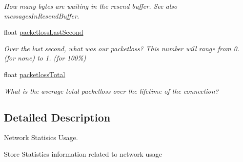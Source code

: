 \begin{DoxyCompactItemize}
\begin{DoxyCompactList}\small\item\em How many bytes are waiting in the resend buffer. See also messages\-In\-Resend\-Buffer. \end{DoxyCompactList}\item 
\hypertarget{struct_rak_net_1_1_rak_net_statistics_a9b089df46c6c965c68fe5eabb00dfb75}{float \hyperlink{struct_rak_net_1_1_rak_net_statistics_a9b089df46c6c965c68fe5eabb00dfb75}{packetloss\-Last\-Second}}\label{struct_rak_net_1_1_rak_net_statistics_a9b089df46c6c965c68fe5eabb00dfb75}

\begin{DoxyCompactList}\small\item\em Over the last second, what was our packetloss? This number will range from 0. (for none) to 1. (for 100\%) \end{DoxyCompactList}\item 
\hypertarget{struct_rak_net_1_1_rak_net_statistics_a4b86428f78da4893ca8b270508db328a}{float \hyperlink{struct_rak_net_1_1_rak_net_statistics_a4b86428f78da4893ca8b270508db328a}{packetloss\-Total}}\label{struct_rak_net_1_1_rak_net_statistics_a4b86428f78da4893ca8b270508db328a}

\begin{DoxyCompactList}\small\item\em What is the average total packetloss over the lifetime of the connection? \end{DoxyCompactList}\end{DoxyCompactItemize}


\subsection{Detailed Description}
Network Statisics Usage. 

Store Statistics information related to network usage 


